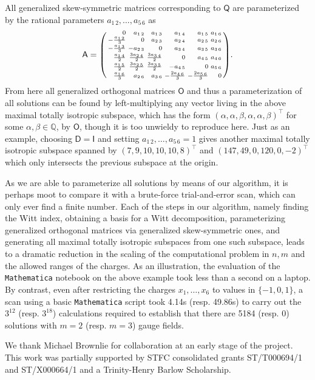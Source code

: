 \documentclass[11pt,a4paper]{article}
\begin{document}
All generalized skew-symmetric matrices corresponding to $\mathsf{Q}$ are parameterized by the rational parameters $a_{1\, 2},\dots,a_{5\,6}$ as
$$\mathsf{A}=
\begin{psmallmatrix*}[r]
	0 & a_{1\, 2} & a_{1\, 3} & a_{1\, 4} & a_{1\, 5} & a_{1\, 6} \\
	-\frac{a_{1\, 2}}{3} & 0 & a_{2\, 3} & a_{2\, 4} & a_{2\, 5} & a_{2\, 6} \\
	-\frac{a_{1\, 3}}{3} & -a_{2\, 3} & 0 & a_{3\, 4} & a_{3\, 5} & a_{3\, 6} \\
	\frac{a_{1\, 4}}{2} & \frac{3 a_{2\, 4}}{2} & \frac{3 a_{3\, 4}}{2} & 0 & a_{4\, 5} & a_{4\, 6} \\
	\frac{a_{1\, 5}}{2} & \frac{3 a_{2\, 5}}{2} & \frac{3 a_{3\, 5}}{2} & -a_{4\, 5} & 0 & a_{5\, 6} \\
	\frac{a_{1\, 6}}{3} & a_{2\, 6} & a_{3\, 6} & -\frac{2 a_{4\, 6}}{3} & -\frac{2a_{5\, 6}}{3}  & 0 \\
\end{psmallmatrix*}.
$$
From here all generalized orthogonal matrices $\mathsf{O}$ and thus a parameterization of all solutions can be found by left-multiplying any vector living in the above maximal totally isotropic subspace, which has the form $(\alpha,\alpha,\beta,\alpha,\alpha,\beta)^\intercal$ for some $\alpha,\beta\in\mathbb{Q}$, by $\mathsf{O}$, though it is too unwieldy to reproduce here. Just as an example, choosing $\mathsf{D}=\mathsf{I}$ and setting $a_{1\,2},\dots,a_{5\,6}=1$ gives another maximal totally isotropic subspace spanned by $(7,9,10,10,10,8)^\intercal$ and $(147,49,0,120,0,-2)^\intercal$ which only intersects the previous subspace at the origin.

As we are able to parameterize all solutions by means of our algorithm, it is perhaps moot to compare it with a brute-force trial-and-error scan, which can only ever find a finite number. Each of the steps in our algorithm, 
namely finding the Witt index, obtaining a basis for a Witt decomposition, parameterizing generalized orthogonal matrices via generalized skew-symmetric ones, and generating all maximal totally isotropic subspaces from one such subspace, leads to a dramatic reduction in the scaling of the computational problem in $n,m$ and the allowed ranges of the charges. As an illustration, the evaluation of the {\tt Mathematica} notebook on the above example took less than a second on a laptop. By contrast, even after restricting the charges $x_1,\dots,x_6$ to values in $\{-1,0,1\}$, a scan using a basic {\tt Mathematica} script took 4.14s (resp. 49.86s) to carry out the $3^{12}$ (resp. $3^{18}$) calculations required to establish that there are 5184 (resp. 0) solutions with $m=2$ (resp. $m=3$) gauge fields.  

\acknowledgments
We thank Michael Brownlie for collaboration at an early stage of the project. This work was partially supported by STFC consolidated grants ST/T000694/1 and ST/X000664/1 and a Trinity-Henry Barlow Scholarship.

      
  
\end{document}
